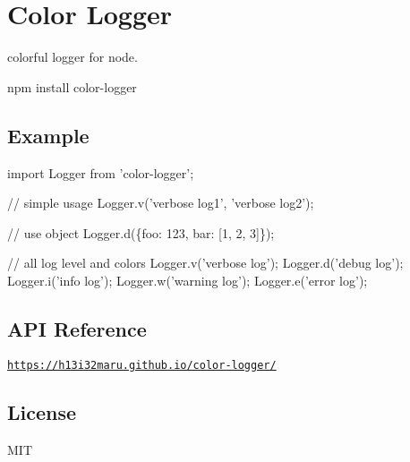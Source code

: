 \href{https://travis-ci.org/h13i32maru/color-logger}{\tt } \href{https://coveralls.io/r/h13i32maru/color-logger}{\tt }

\section*{Color Logger}

colorful logger for node.


\begin{DoxyCode}
npm install color-logger
\end{DoxyCode}


\subsection*{Example}


\begin{DoxyCode}
import Logger from 'color-logger';

// simple usage
Logger.v('verbose log1', 'verbose log2');

// use object
Logger.d(\{foo: 123, bar: [1, 2, 3]\});

// all log level and colors
Logger.v('verbose log');
Logger.d('debug log');
Logger.i('info log');
Logger.w('warning log');
Logger.e('error log');
\end{DoxyCode}




\subsection*{A\+PI Reference}

\href{https://h13i32maru.github.io/color-logger/}{\tt https\+://h13i32maru.\+github.\+io/color-\/logger/}

\subsection*{License}

M\+IT 